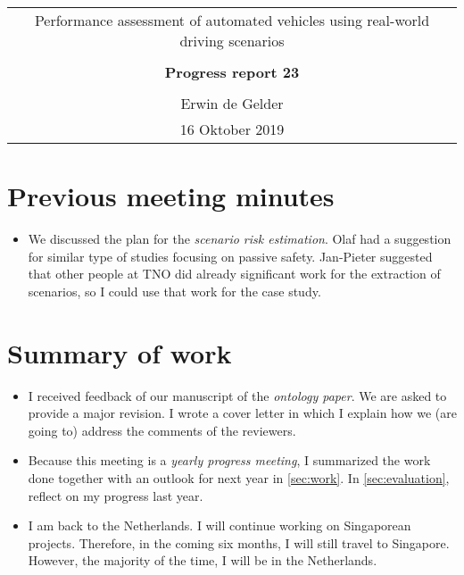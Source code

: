 \documentclass[10pt,final,a4paper,oneside,onecolumn]{article}
\newcommand{\progressreportnumber}{23}
\renewcommand{\author}{Erwin de Gelder}
\renewcommand{\date}{16 Oktober 2019}
\renewcommand{\title}{Performance assessment of automated vehicles using real-world driving scenarios}
\begin{document}
	
\begin{center}
	\begin{tabular}{c}
		\title \\ \\
		\textbf{\huge Progress report \progressreportnumber} \\ \\
		\author \\ 
		\date
	\end{tabular}
\end{center}



\section{Previous meeting minutes}

\begin{itemize}
	\item We discussed the plan for the \emph{scenario risk estimation}. Olaf had a suggestion for similar type of studies focusing on passive safety. Jan-Pieter suggested that other people at TNO did already significant work for the extraction of scenarios, so I could use that work for the case study.
\end{itemize}



\section{Summary of work}

\begin{itemize}
	\item I received feedback of our manuscript of the \emph{ontology paper}. We are asked to provide a major revision. I wrote a cover letter in which I explain how we (are going to) address the comments of the reviewers.
	
	\item Because this meeting is a \emph{yearly progress meeting}, I summarized the work done together with an outlook for next year in \cref{sec:work}. In \cref{sec:evaluation}, reflect on my progress last year.
	
	\item I am back to the Netherlands. I will continue working on Singaporean projects. Therefore, in the coming six months, I will still travel to Singapore. However, the majority of the time, I will be in the Netherlands. 
\end{itemize}
\end{document}
